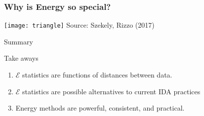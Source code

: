 \documentclass[presentation]{beamer}
\begin{document}
\begin{frame}
  \fontsize{7pt}{7.2}\selectfont
  \frametitle{Why is Energy so special?}
  \begin{center}
    \centering
    \texttt{[image: triangle]}
    Source: Szekely, Rizzo (2017)
  \end{center}
\end{frame}

\begin{frame}{Summary}
  \begin{block}{Take aways}
    \begin{enumerate}
    \item $\mathcal{E}$ statistics are functions of distances between data.
    \item $\mathcal{E}$ statistics are possible alternatives to
      current IDA practices
    \item Energy methods are powerful, consistent, and practical.
    \end{enumerate}
  \end{block}
\end{frame}
\end{document}
